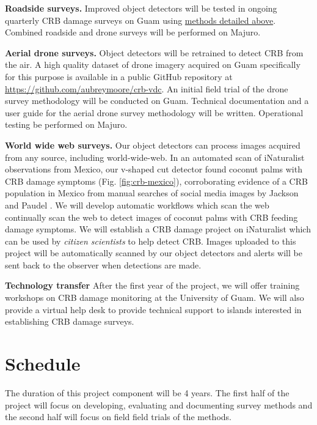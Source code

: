 \documentclass[11pt,english,letterpaper]{scrartcl}
\begin{document}
\textbf{Roadside surveys.} Improved object detectors will be tested in ongoing quarterly CRB damage surveys on Guam using \hyperref[previous_work]{methods detailed above}. Combined roadside and drone surveys will be performed on Majuro. 

\textbf{Aerial drone surveys.} Object detectors will be retrained to detect CRB from the air. A high quality dataset of drone imagery acquired on Guam specifically for this purpose is available in a public GitHub repository at \url{https://github.com/aubreymoore/crb-vdc}. An initial field trial of the drone survey methodology will be conducted on Guam. Technical documentation and a user guide for the aerial drone survey methodology will be written. Operational testing be performed on Majuro.

\textbf{World wide web surveys.} Our object detectors can process images acquired from any source, including world-wide-web. In an automated scan of iNaturalist observations from Mexico, our v-shaped cut detector found coconut palms with CRB damage symptoms (Fig. \ref{fig:crb-mexico}), corroborating evidence of a CRB population in Mexico from manual searches of social media images by Jackson and Paudel \cite{Jackson2022}. We will develop automatic workflows which scan the web continually scan the web to detect images of coconut palms with CRB feeding damage symptoms. We will establish a CRB damage project on iNaturalist which can be used by \textit{citizen scientists} to help detect CRB. Images uploaded to this project will be automatically scanned by our object detectors and alerts will be sent back to the observer when detections are made.

\textbf{Technology transfer} After the first year of the project, we will offer training workshops on CRB damage monitoring at the University of Guam. We will also provide a virtual help desk to provide technical support to islands interested in establishing CRB damage surveys.

\section{Schedule}


The duration of this project component will be 4 years. The first half of the project will focus on developing, evaluating and documenting survey methods and the second half will focus on field field trials of the methods.
\end{document}
